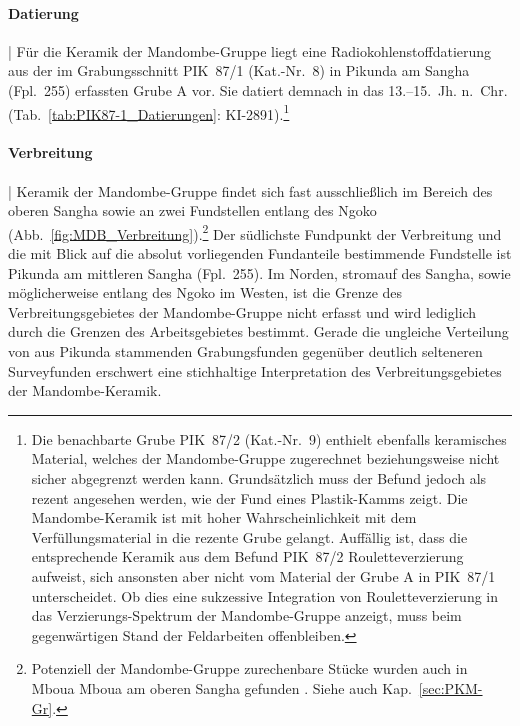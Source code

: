 \paragraph{Datierung}\hspace{-.5em}|\hspace{.5em}%
Für die Keramik der Mandombe-Gruppe liegt eine Radiokohlenstoffdatierung aus der im Grabungsschnitt PIK~87/1 (Kat.-Nr.~8) in Pikunda am \mbox{Sangha} (Fpl.~255) erfassten Grube A vor. Sie datiert demnach in das 13.--15.~Jh. n.~Chr. (Tab.~\ref{tab:PIK87-1_Datierungen}: KI-2891).\footnote{Die benachbarte Grube PIK~87/2 (Kat.-Nr.~9) enthielt ebenfalls keramisches Material, welches der Mandombe-Gruppe zugerechnet beziehungsweise nicht sicher abgegrenzt werden kann. Grundsätzlich muss der Befund jedoch als rezent angesehen werden, wie der Fund eines Plastik-Kamms zeigt. Die Mandombe-Keramik ist mit hoher Wahrscheinlichkeit mit dem Verfüllungsmaterial in die rezente Grube gelangt. Auffällig ist, dass die entsprechende Keramik aus dem Befund PIK~87/2 Rouletteverzierung aufweist, sich ansonsten aber nicht vom Material der Grube A in PIK~87/1 unterscheidet. Ob dies eine sukzessive Integration von Rouletteverzierung in das Verzierungs-Spektrum der Mandombe-Gruppe anzeigt, muss beim gegenwärtigen Stand der Feldarbeiten offenbleiben.}

\paragraph{Verbreitung}\hspace{-.5em}|\hspace{.5em}%
Keramik der Mandombe-Gruppe findet sich fast ausschließlich im Bereich des oberen \mbox{Sangha} sowie an zwei Fundstellen entlang des \mbox{Ngoko} (Abb.~\ref{fig:MDB_Verbreitung}).\footnote{Potenziell der Mandombe-Gruppe zurechenbare Stücke wurden auch in Mboua Mboua am oberen \mbox{Sangha} gefunden \parencite[114 Abb.~42]{Gillet.2013}. Siehe auch Kap.~\ref{sec:PKM-Gr}.} Der südlichste Fundpunkt der Verbreitung und die mit Blick auf die absolut vorliegenden Fundanteile bestimmende Fundstelle ist Pikunda am mittleren \mbox{Sangha} (Fpl.~255). Im Norden, stromauf des \mbox{Sangha}, sowie möglicherweise entlang des \mbox{Ngoko} im Westen, ist die Grenze des Verbreitungsgebietes der Mandombe-Gruppe nicht erfasst und wird lediglich durch die Grenzen des Arbeitsgebietes bestimmt. Gerade die ungleiche Verteilung von aus Pikunda stammenden Grabungsfunden gegenüber deutlich selteneren Surveyfunden erschwert eine stichhaltige Interpretation des Verbreitungsgebietes der Mandombe-Keramik. 